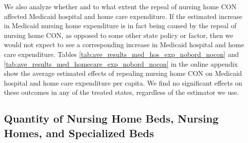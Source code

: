 \documentclass[../Main.tex]{subfiles}
\begin{document}
\indent We also analyze whether and to what extent the repeal of nursing home CON affected Medicaid hospital and home care expenditure. If the estimated increase in Medicaid nursing home expenditure is in fact being caused by the repeal of nursing home CON, as opposed to some other state policy or factor, then we would not expect to see a corresponding increase in Medicaid hospital and home care expenditure. Tables \ref{tab:ave_results_med_hos_exp_nobord_nocon} and \ref{tab:ave_results_med_homecare_exp_nobord_nocon} in the online appendix show the average estimated effects of repealing nursing home CON on Medicaid hospital and home care expenditure per capita. We find no significant effects on these outcomes in any of the treated states, regardless of the estimator we use.


\subsection{Quantity of Nursing Home Beds, Nursing Homes, and Specialized Beds}
\end{document}
